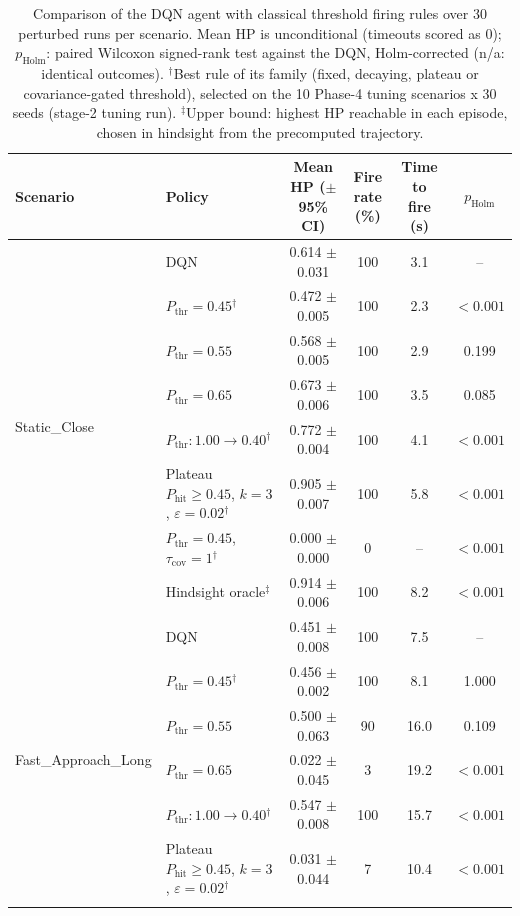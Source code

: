 \begin{table}[htbp]
\centering
\caption{Comparison of the DQN agent with classical threshold firing rules over 30 perturbed runs per scenario. Mean HP is unconditional (timeouts scored as 0); $p_{\mathrm{Holm}}$: paired Wilcoxon signed-rank test against the DQN, Holm-corrected (n/a: identical outcomes). $^{\dagger}$Best rule of its family (fixed, decaying, plateau or covariance-gated threshold), selected on the 10 Phase-4 tuning scenarios x 30 seeds (stage-2 tuning run). $^{\ddagger}$Upper bound: highest HP reachable in each episode, chosen in hindsight from the precomputed trajectory.}
\label{tab:comparison-traditional-rl}
\small
\begin{tabular}{llcccc}
\toprule
\textbf{Scenario} & \textbf{Policy} & \textbf{Mean HP ($\pm$95\% CI)} & \textbf{Fire rate (\%)} & \textbf{Time to fire (s)} & $p_{\mathrm{Holm}}$ \\
\midrule
\multirow{8}{*}{Static\_Close} & DQN & 0.614 $\pm$ 0.031 & 100 & 3.1 & -- \\
 & $P_{\mathrm{thr}}=0.45$$^{\dagger}$ & 0.472 $\pm$ 0.005 & 100 & 2.3 & $<0.001$ \\
 & $P_{\mathrm{thr}}=0.55$ & 0.568 $\pm$ 0.005 & 100 & 2.9 & 0.199 \\
 & $P_{\mathrm{thr}}=0.65$ & 0.673 $\pm$ 0.006 & 100 & 3.5 & 0.085 \\
 & $P_{\mathrm{thr}}: 1.00 \to 0.40$$^{\dagger}$ & 0.772 $\pm$ 0.004 & 100 & 4.1 & $<0.001$ \\
 & Plateau $P_{\mathrm{hit}}\geq0.45$, $k=3$, $\varepsilon=0.02$$^{\dagger}$ & 0.905 $\pm$ 0.007 & 100 & 5.8 & $<0.001$ \\
 & $P_{\mathrm{thr}}=0.45$, $\tau_{\mathrm{cov}}=1$$^{\dagger}$ & 0.000 $\pm$ 0.000 & 0 & -- & $<0.001$ \\
 & Hindsight oracle$^{\ddagger}$ & 0.914 $\pm$ 0.006 & 100 & 8.2 & $<0.001$ \\
\midrule
\multirow{8}{*}{Fast\_Approach\_Long} & DQN & 0.451 $\pm$ 0.008 & 100 & 7.5 & -- \\
 & $P_{\mathrm{thr}}=0.45$$^{\dagger}$ & 0.456 $\pm$ 0.002 & 100 & 8.1 & 1.000 \\
 & $P_{\mathrm{thr}}=0.55$ & 0.500 $\pm$ 0.063 & 90 & 16.0 & 0.109 \\
 & $P_{\mathrm{thr}}=0.65$ & 0.022 $\pm$ 0.045 & 3 & 19.2 & $<0.001$ \\
 & $P_{\mathrm{thr}}: 1.00 \to 0.40$$^{\dagger}$ & 0.547 $\pm$ 0.008 & 100 & 15.7 & $<0.001$ \\
 & Plateau $P_{\mathrm{hit}}\geq0.45$, $k=3$, $\varepsilon=0.02$$^{\dagger}$ & 0.031 $\pm$ 0.044 & 7 & 10.4 & $<0.001$ \\
$$
\end{tabular}
\end{table}
